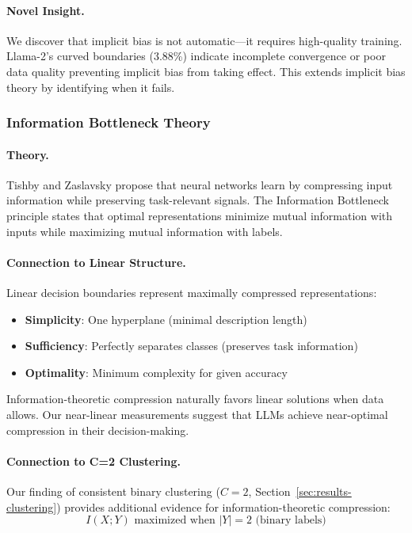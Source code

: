 \documentclass[11pt]{article}
\begin{document}
\paragraph{Novel Insight.}
We discover that implicit bias is not automatic---it requires high-quality training. Llama-2's curved boundaries (3.88\%) indicate incomplete convergence or poor data quality preventing implicit bias from taking effect. This extends implicit bias theory by identifying when it fails.

\subsubsection{Information Bottleneck Theory}

\paragraph{Theory.}
Tishby and Zaslavsky \citep{tishby2015deep} propose that neural networks learn by compressing input information while preserving task-relevant signals. The Information Bottleneck principle \citep{tishby2000information} states that optimal representations minimize mutual information with inputs while maximizing mutual information with labels.

\paragraph{Connection to Linear Structure.}
Linear decision boundaries represent maximally compressed representations:
\begin{itemize}
    \item \textbf{Simplicity}: One hyperplane (minimal description length)
    \item \textbf{Sufficiency}: Perfectly separates classes (preserves task information)
    \item \textbf{Optimality}: Minimum complexity for given accuracy
\end{itemize}

Information-theoretic compression naturally favors linear solutions when data allows. Our near-linear measurements suggest that LLMs achieve near-optimal compression in their decision-making.

\paragraph{Connection to C=2 Clustering.}
Our finding of consistent binary clustering ($C=2$, Section~\ref{sec:results-clustering}) provides additional evidence for information-theoretic compression:
\begin{equation}
I(X; Y) \text{ maximized when } |Y| = 2 \text{ (binary labels)}
\end{equation}
\end{document}
